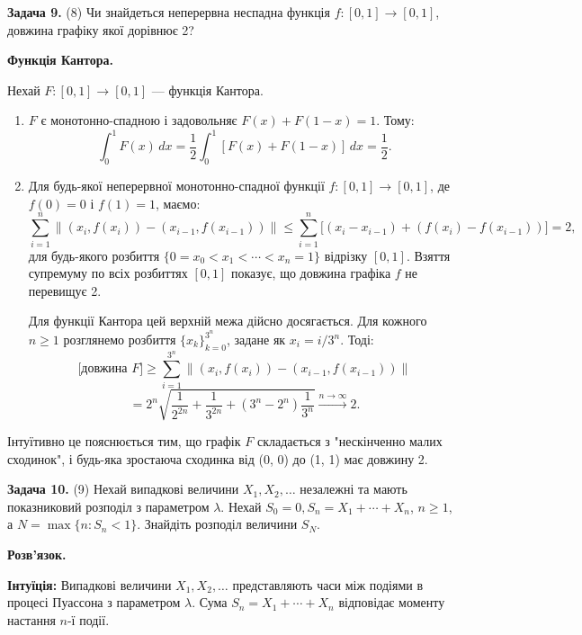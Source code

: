 \documentclass{article}
\begin{document}
\bigskip

\noindent\textbf{Задача 9.} (8) Чи знайдеться неперервна неспадна функція \( f : [0,1] \to [0,1] \), довжина графіку якої дорівнює 2?

\textbf{Функція Кантора.}

Нехай \( F : [0, 1] \to [0, 1] \) — функція Кантора.

\begin{enumerate}
    \item \( F \) є монотонно-спадною і задовольняє \( F(x) + F(1 - x) = 1 \). Тому:
    \[
    \int_0^1 F(x) \, dx = \frac{1}{2} \int_0^1 [F(x) + F(1 - x)] \, dx = \frac{1}{2}.
    \]

    \item Для будь-якої неперервної монотонно-спадної функції \( f : [0, 1] \to [0, 1] \), де \( f(0) = 0 \) і \( f(1) = 1 \), маємо:
    \[
    \sum_{i=1}^n \lVert (x_i, f(x_i)) - (x_{i-1}, f(x_{i-1})) \rVert \leq \sum_{i=1}^n \big[(x_i - x_{i-1}) + (f(x_i) - f(x_{i-1})) \big] = 2,
    \]
    для будь-якого розбиття \( \{0 = x_0 < x_1 < \cdots < x_n = 1\} \) відрізку \([0,1]\). Взяття супремуму по всіх розбиттях \([0,1]\) показує, що довжина графіка \( f \) не перевищує 2.

    Для функції Кантора цей верхній межа дійсно досягається. Для кожного \( n \geq 1 \) розглянемо розбиття \( \{x_k\}_{k=0}^{3^n} \), задане як \( x_i = i / 3^n \). Тоді:
    \[
    \text{[довжина } F] \geq \sum_{i=1}^{3^n} \lVert (x_i, f(x_i)) - (x_{i-1}, f(x_{i-1})) \rVert
    \]
    \[
    = 2^n \sqrt{\frac{1}{2^{2n}} + \frac{1}{3^{2n}} + (3^n - 2^n)\frac{1}{3^n}} \xrightarrow{n \to \infty} 2.
    \]
\end{enumerate}

Інтуїтивно це пояснюється тим, що графік \( F \) складається з "нескінченно малих сходинок", і будь-яка зростаюча сходинка від (0, 0) до (1, 1) має довжину 2.

\bigskip

\noindent\textbf{Задача 10.} (9) Нехай випадкові величини \(X_1, X_2, \dots\) незалежні та мають показниковий розподіл з параметром \(\lambda\). Нехай \(S_0 = 0, S_n = X_1 + \cdots + X_n\), \(n \geq 1\), а \(N = \max\{n : S_n < 1\}\). Знайдіть розподіл величини \(S_N\).

\textbf{Розв’язок.}  

\textbf{Інтуїція:} Випадкові величини \(X_1, X_2, \dots\) представляють часи між подіями в процесі Пуассона з параметром \(\lambda\). Сума \(S_n = X_1 + \cdots + X_n\) відповідає моменту настання \(n\)-ї події.  
\end{document}
